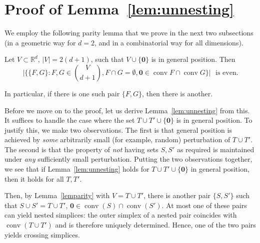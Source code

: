 \documentclass[english,a4paper,nolineno]{lipics-v2019}
\newcommand{\nula}{\mathbf{0}}
\newcommand{\conv}{\mathop{\mathrm{conv}}}
\begin{document}



\section{Proof of Lemma~\ref{lem:unnesting}}\label{sec:parity}
We employ the following parity lemma that we prove in the next two subsections (in a geometric way for $d=2$, and in a combinatorial way for all dimensions).

\begin{lemma}\label{lemparity} Let $V\subset \mathbb R^d$, $|V|=2(d+1)$, such that $V\cup\{\nula\}$ is in general position. Then
$$\Big|\Big\{\{F,G\}:F,G\in {V\choose d+1}, F\cap G=\emptyset, \nula\in \conv F\cap \conv G\Big\}\Big| \ \ \ \text{is even.}$$
\end{lemma}
In particular, if there is one such pair $\{F,G\}$, then there is another.

Before we move on to the proof, let us derive Lemma~\ref{lem:unnesting} from this. It suffices to handle the case where the set $T\cup T'\cup\{\nula\}$ is in general position. To justify this, we make two observations. The first is that general position is achieved by \emph{some} arbitrarily small (for example, random) perturbation of $T\cup T'$. The second is that the property of \emph{not} having sets $S,S'$ as required is maintained under \emph{any} sufficiently small perturbation. Putting the two observations together, we see that if Lemma~\ref{lem:unnesting} holds for $T\cup T'\cup\{\nula\}$ in general position, then it holds for all $T,T'$.

Then, by Lemma~\ref{lemparity} with $V=T\cup T'$, there is another pair $\{S,S'\}$ such that $S\cup S'=T\cup T'$, $\nula \in \conv(S)\cap\conv(S')$. At most one of these pairs can yield nested simplices: the outer simplex of a nested pair coincides with $\conv(T\cup T')$ and is therefore uniquely determined. Hence, one of the two pairs yields crossing simplices. 
\end{document}
